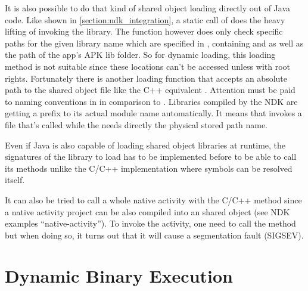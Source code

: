 It is also possible to do that kind of shared object loading directly out of Java
code. Like shown in \autoref{section:ndk_integration}, a static call of 
 does the heavy lifting of invoking the library. 
The  function however does only check specific paths for the given
library name which are specified in , containing 
 and  as well as the path of the app's APK lib
folder. So for dynamic loading, this loading method is not suitable since these
locations can't be accessed unless with root rights. Fortunately there is another
loading function  that accepts an absolute path to 
the shared object file like the C++ equivalent . Attention must be
paid to naming conventions in  in comparison to .
Libraries compiled by the NDK are getting a  prefix to its actual module
name automatically. It means that  invokes a file
that's called  while the  needs directly the physical
stored path name.

Even if Java is also capable of loading shared object libraries at runtime, the 
signatures of the library to load has to be implemented before to be able to call
its methods unlike the C/C++ implementation where symbols can be resolved itself.

It can also be tried to call a whole native activity with the C/C++ method since
a native activity project can be also compiled into an shared object (see NDK
examples ``native-activity''). To invoke the activity, one need to call the
 method but when doing so, it turns out that it will cause
a segmentation fault (SIGSEV).


\section{Dynamic Binary Execution}\label{section:dyn_bin_exec}

